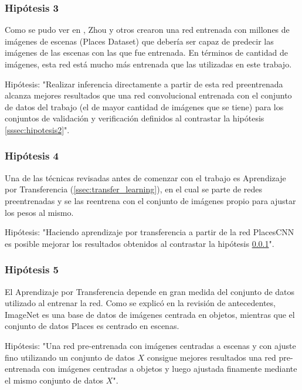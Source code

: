 \subsubsection{Hipótesis 3} \label{sssec:hipotesis3}
Como se pudo ver en \cite{learning_deep_features}, Zhou y otros crearon una red entrenada con millones de imágenes de escenas (Places Dataset) que debería ser capaz de predecir las imágenes de las escenas con las que fue entrenada. En términos de cantidad de imágenes, esta red está mucho más entrenada que las utilizadas en este trabajo. 

Hipótesis: "Realizar inferencia directamente a partir de esta red preentrenada alcanza mejores resultados que una red convolucional entrenada con el conjunto de datos del trabajo \cite{vision_based_real_estate_price_estimation} (el de mayor cantidad de imágenes que se tiene) para los conjuntos de validación y verificación definidos al contrastar la hipótesis \ref{sssec:hipotesis2}".

\subsubsection{Hipótesis 4} \label{sssec:hipotesis4}
Una de las técnicas revisadas antes de comenzar con el trabajo es Aprendizaje por Transferencia (\ref{ssec:transfer_learning}), en el cual se parte de redes preentrenadas y se las reentrena con el conjunto de imágenes propio para ajustar los pesos al mismo. 

Hipótesis: "Haciendo aprendizaje por transferencia a partir de la red PlacesCNN es posible mejorar los resultados obtenidos al contrastar la hipótesis \ref{sssec:hipotesis3}".

\subsubsection{Hipótesis 5} \label{sssec:hipotesis5}
El Aprendizaje por Transferencia depende en gran medida del conjunto de datos utilizado al entrenar la red. Como se explicó en la revisión de antecedentes, ImageNet es una base de datos de imágenes centrada en objetos, mientras que el conjunto de datos Places es centrado en escenas. 

Hipótesis: "Una red pre-entrenada con imágenes centradas a escenas y con ajuste fino utilizando un conjunto de datos \(X\) consigue mejores resultados una red pre-entrenada con imágenes centradas a objetos y luego ajustada finamente mediante el mismo conjunto de datos \(X\)".

